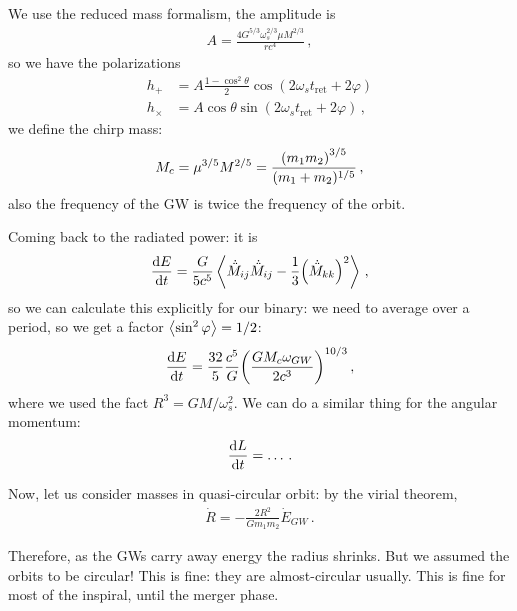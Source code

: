 \documentclass[main.tex]{subfiles}
\begin{document}
We use the reduced mass formalism, the amplitude is 
%
\begin{align}
A = \frac{4 G^{5/3} \omega_{s}^{2/3} \mu M^{2/3}}{r c^{4}}
\,,
\end{align}
%
so we have the polarizations 
%
\begin{align}
h_{+} &= A \frac{1 - \cos^2\theta   }{2} \cos(2 \omega_{s} t _{\text{ret}} + 2 \varphi ) \\ 
h_{\times } &= A \cos \theta  \sin(2 \omega_{s} t _{\text{ret}} + 2 \varphi )  
\,,
\end{align}
%
we define the chirp mass: 
%
\begin{align}
M_c = \mu ^{3/5} M^{2/5} = \frac{\qty(m_1 m_2 )^{3/5}}{(m_1 + m_2 )^{1/5}}
\,,
\end{align}
%
also the frequency of the GW is twice the frequency of the orbit. 

Coming back to the radiated power: it is 
%
\begin{align}
\dv{E}{t} = \frac{G}{5 c^{5}} \expval{\dot{\ddot{M}}_{ij} \dot{\ddot{M}}_{ij} - \frac{1}{3} \qty(\dot{\ddot{M}}_{kk})^2}
\,,
\end{align}
%
so we can calculate this explicitly for our binary: we need to average over a period, so we get a factor \(\expval{\sin^2\varphi } = 1/2\): 
%
\begin{align}
\dv{E}{t} = \frac{32}{5} \frac{c^{5}}{G} \qty(\frac{GM_c \omega_{GW}}{2 c^{3}})^{ 10 /3}
\,,
\end{align}
%
where we used the fact \(R^3 = GM / \omega_{s}^2\).
We can do a similar thing for the angular momentum: 
%
\begin{align}
\dv{L}{t} = \dots
\,.
\end{align}

Now, let us consider masses in quasi-circular orbit: by the virial theorem, 
%
\begin{align}
\dot{R} = - \frac{2R^2}{G m_1 m_2 } \dot{E}_{GW}
\,.
\end{align}

Therefore, as the GWs carry away energy the radius shrinks. 
But we assumed the orbits to be circular! This is fine: they are almost-circular usually. 
This is fine for most of the inspiral, until the merger phase. 
\end{document}
